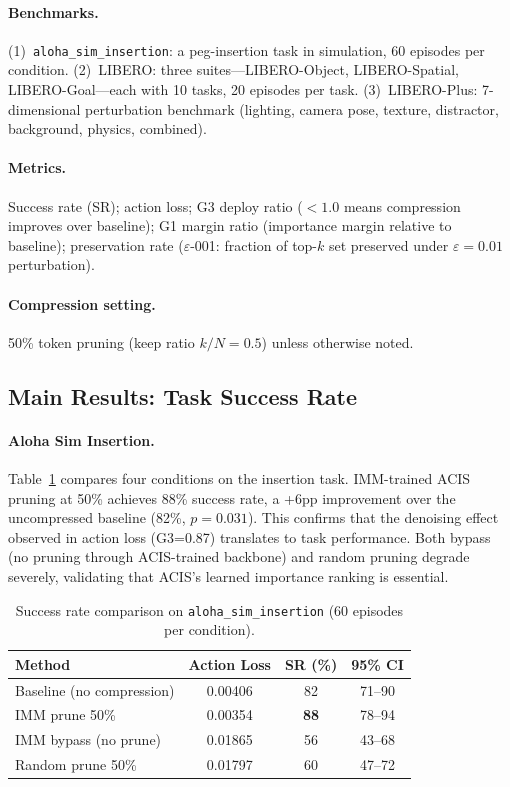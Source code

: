 \documentclass[10pt,twocolumn]{article}
\newcommand{\eps}{\varepsilon}
\begin{document}
\paragraph{Benchmarks.} (1)~\texttt{aloha\_sim\_insertion}: a peg-insertion task in simulation, 60 episodes per condition. (2)~LIBERO: three suites---LIBERO-Object, LIBERO-Spatial, LIBERO-Goal---each with 10 tasks, 20 episodes per task. (3)~LIBERO-Plus: 7-dimensional perturbation benchmark (lighting, camera pose, texture, distractor, background, physics, combined).

\paragraph{Metrics.} Success rate (SR); action loss; G3 deploy ratio ($<1.0$ means compression improves over baseline); G1 margin ratio (importance margin relative to baseline); preservation rate ($\eps$-001: fraction of top-$k$ set preserved under $\eps=0.01$ perturbation).

\paragraph{Compression setting.} 50\% token pruning (keep ratio $k/N = 0.5$) unless otherwise noted.

\subsection{Main Results: Task Success Rate}
\label{sec:main_results}

\paragraph{Aloha Sim Insertion.}
Table~\ref{tab:aloha} compares four conditions on the insertion task. IMM-trained ACIS pruning at 50\% achieves 88\% success rate, a +6pp improvement over the uncompressed baseline (82\%, $p=0.031$). This confirms that the denoising effect observed in action loss (G3=0.87) translates to task performance. Both bypass (no pruning through ACIS-trained backbone) and random pruning degrade severely, validating that ACIS's learned importance ranking is essential.

\begin{table}[t]
\centering
\caption{Success rate comparison on \texttt{aloha\_sim\_insertion} (60 episodes per condition).}
\label{tab:aloha}
\begin{tabular}{lccc}
\toprule
Method & Action Loss & SR (\%) & 95\% CI \\
\midrule
Baseline (no compression) & 0.00406 & 82 & 71--90 \\
IMM prune 50\% & 0.00354 & \textbf{88} & 78--94 \\
IMM bypass (no prune) & 0.01865 & 56 & 43--68 \\
Random prune 50\% & 0.01797 & 60 & 47--72 \\
\bottomrule
\end{tabular}
\end{table}
\end{document}
